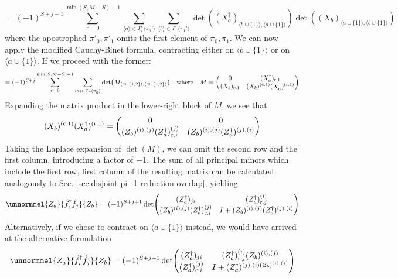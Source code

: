 \documentclass[12pt]{article}
\newcommand{\seq}[1]{\langle #1\rangle}
\newcommand{\hc}{^\dagger}
\begin{document}
	\begin{equation}
	=(-1)^{S+j-1}\sum_{r=0}^{\min(S, M-S)-1}\sum_{\seq{a}\in\Gamma_{r}\seq{\pi_0'}}\sum_{\seq{b}\in\Gamma_{r}\seq{\pi_1'}}\det((X_a\hc)_{\seq{b\cup\{1\}},\seq{a\cup\{1\}}})\det((X_b)_{\seq{a\cup\{1\}}, \seq{b\cup\{1\}}})
	\end{equation}
	where the apostrophed $\pi'_0, \pi'_1$ omits the first element of $\pi_0, \pi_1$. We can now apply the modified Cauchy-Binet formula, contracting either on $\seq{b\cup\{1\}}$ or on $\seq{a\cup\{1\}}$. If we proceed with the former:
	\begin{equation*}
	=(-1)^{S+j}\sum_{r=0}^{\min(S, M-S)-1}\sum_{\seq{a}\in\Gamma_{r}\seq{\pi_0'}}\det(M_{\seq{a\cup\{1,2\}}, \seq{a\cup\{1,2\}}})\qq{where}M=\mqty(
		0 & (X_a\hc)_{\text{r.} 1}\\
		(X_b)_{\text{c.} 1} & (X_b)^{(\text{c.} 1)}(X_a\hc)^{(\text{r.} 1)}
	)
	\end{equation*}
	Expanding the matrix product in the lower-right block of $M$, we see that
	\begin{equation*}
	(X_b)^{(\text{c.} 1)}(X_a\hc)^{(\text{r.} 1)}=\mqty(
		0 & 0\\
		(Z_b)^{(i),(j)}(Z_a\hc)^{(j)}_{\text{c.} i} & (Z_b)^{(i),(j)}(Z_a\hc)^{(j),(i)}
	)
	\end{equation*}
	Taking the Laplace expansion of $\det(M)$, we can omit the second row and the first column, introducing a factor of $-1$. The sum of all principal minors which include the first row, first column of the resulting matrix can be calculated analogously to Sec. \ref{sec:disjoint pi_1 reduction overlap}, yielding
	\begin{equation}
	\unnormmel{Z_a}{\hat{f}\hc_i\hat{f}_j}{Z_b}=(-1)^{S+j+1}\det(\mqty{
		(Z_a\hc)_{ji} & (Z_a\hc)^{(i)}_{\text{r.} j}\\
		(Z_b)^{(i),(j)}(Z_a\hc)^{(j)}_{\text{c.} i} & I+(Z_b)^{(i),(j)}(Z_a\hc)^{(j),(i)}
	})
	\end{equation}
	Alternatively, if we chose to contract on $\seq{a\cup\{1\}}$ instead, we would have arrived at the alternative formulation
	\begin{equation}
	\unnormmel{Z_a}{\hat{f}\hc_i\hat{f}_j}{Z_b}=(-1)^{S+j+1}\det(\mqty{
		(Z_a\hc)_{ji} & (Z_a\hc)^{(i)}_{\text{r.} j}(Z_b)^{(i),(j)}\\
		(Z_a\hc)^{(j)}_{\text{c.} i} & I+(Z_a\hc)^{(j),(i)(Z_b)^{(i),(j)}}
	})
	\end{equation}
	 
	
\end{document}
